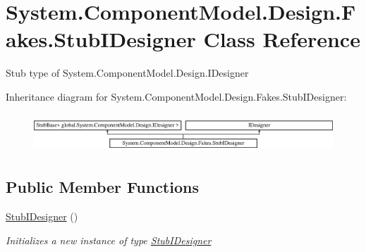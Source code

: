 \hypertarget{class_system_1_1_component_model_1_1_design_1_1_fakes_1_1_stub_i_designer}{\section{System.\-Component\-Model.\-Design.\-Fakes.\-Stub\-I\-Designer Class Reference}
\label{class_system_1_1_component_model_1_1_design_1_1_fakes_1_1_stub_i_designer}
}


Stub type of System.\-Component\-Model.\-Design.\-I\-Designer 


Inheritance diagram for System.\-Component\-Model.\-Design.\-Fakes.\-Stub\-I\-Designer\-:\begin{figure}[H]
\begin{center}
\leavevmode
\includegraphics[height=1.481482cm]{class_system_1_1_component_model_1_1_design_1_1_fakes_1_1_stub_i_designer}
\end{center}
\end{figure}
\subsection*{Public Member Functions}
\begin{DoxyCompactItemize}
\item 
\hyperlink{class_system_1_1_component_model_1_1_design_1_1_fakes_1_1_stub_i_designer_a8e205914579f3c11ecb3f9c1bf44c878}{Stub\-I\-Designer} ()
\begin{DoxyCompactList}\small\item\em Initializes a new instance of type \hyperlink{class_system_1_1_component_model_1_1_design_1_1_fakes_1_1_stub_i_designer}{Stub\-I\-Designer}\end{DoxyCompactList}\end{DoxyCompactItemize}
